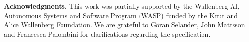 \documentclass[runningheads, envcountsame, a4paper, draft, x11names]{llncs}
\newcommand{\runhead}[1]{\noindent\textbf{#1. }}
\begin{document}
%
% 


\runhead{Acknowledgments} This work was partially supported by
the Wallenberg AI, Autonomous Systems and Software Program (WASP) funded by
the Knut and Alice Wallenberg Foundation.
%
We are grateful to G\"oran Selander, John Mattsson and Francesca Palombini for
clarifications regarding the specification.
%




\end{document}
